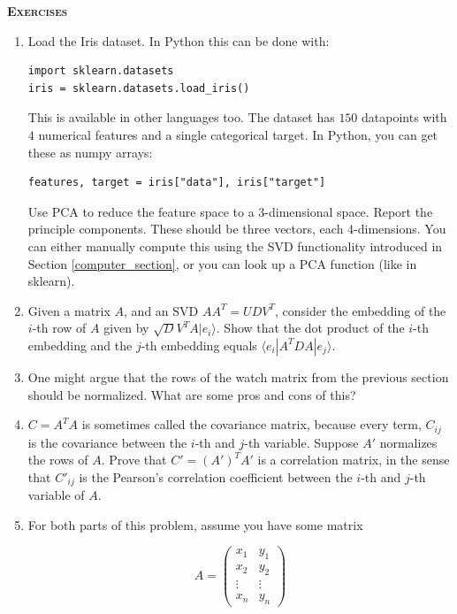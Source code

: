 \documentclass{amsbook}
\begin{document}
{\bfseries\scshape\Large Exercises}

\begin{enumerate}
\item \label{iris_pca} Load the Iris dataset.  In Python this can be done with:

\begin{lstlisting}
import sklearn.datasets
iris = sklearn.datasets.load_iris()
\end{lstlisting}

This is available in other languages too.  The dataset has $150$ datapoints with $4$ numerical features and a single categorical target.  In Python, you can get these as numpy arrays:

\begin{lstlisting}
features, target = iris["data"], iris["target"]
\end{lstlisting}

Use PCA to reduce the feature space to a $3$-dimensional space.  Report the principle components.  These should be three vectors, each $4$-dimensions.  You can either manually compute this using the SVD functionality introduced in Section \ref{computer_section}, or you can look up a PCA function (like in sklearn).
\item Given a matrix $A$, and an SVD $AA^T=UDV^T$, consider the embedding of the $i$-th row of $A$ given by $\sqrt DV^TA|e_i\rangle$.  Show that the dot product of the $i$-th embedding and the $j$-th embedding equals $\langle e_i|A^TDA|e_j\rangle$.
\item One might argue that the rows of the watch matrix from the previous section should be normalized.  What are some pros and cons of this?
\item $C=A^TA$ is sometimes called the covariance matrix, because every term, $C_{ij}$ is the covariance between the $i$-th and $j$-th variable.  Suppose $A'$ normalizes the rows of $A$.  Prove that $C'=(A')^TA'$ is a correlation matrix, in the sense that $C'_{ij}$ is the Pearson's correlation coefficient between the $i$-th and $j$-th variable of $A$.
\item For both parts of this problem, assume you have some matrix

$$
A=\left(\begin{array}{cc} x_1 & y_1 \\ x_2 & y_2 \\ \vdots & \vdots \\ x_n & y_n\end{array}\right)
$$


\end{enumerate}
\end{document}
